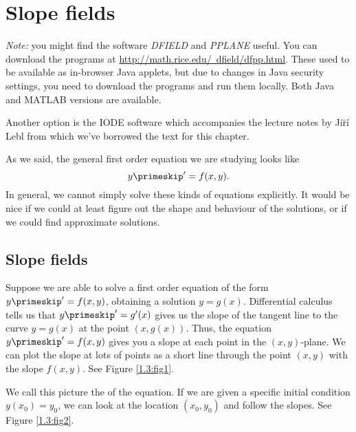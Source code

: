 \section{Slope fields}\label{sec:slopefields}

{\em Note:} you might find the software {\em DFIELD} and {\em PPLANE} useful. You can download the programs at \href{http://math.rice.edu/~dfield/dfpp.html}{http://math.rice.edu/\string~dfield/dfpp.html}. These used to be available as in-browser Java applets, but due to changes in Java security settings, you need to download the programs and run them locally. Both Java and MATLAB versions are available.

Another option is the IODE software which accompanies the lecture notes by Ji\u{r}\'{i} Lebl from which we've borrowed the text for this chapter.

\medskip

As we said, the general first order equation we are studying looks like
\begin{equation*}
y\primeskip ' = f(x,y).
\end{equation*}
In general, we cannot simply solve these kinds of equations explicitly.
It would be nice if we could at least figure out the shape and behaviour of
the solutions, or if we could find approximate solutions.

\subsection*{Slope fields}

Suppose we are able to solve a first order equation of the form $y\primeskip '=f(x,y)$, obtaining a solution $y=g(x)$. Differential calculus tells us that $y\primeskip '=g'(x)$ gives us the slope of the tangent line to the curve $y=g(x)$ at the point $(x,g(x))$.  Thus, the equation $y\primeskip ' = f(x,y)$
gives you a slope at each point 
in the
$(x,y)$-plane.  We can plot the slope at lots of points
as a short line through the point $(x,y)$ with the slope $f(x,y)$.
See Figure \ref{1.3:fig1}.



We call this picture the  of the equation.
If we are given a specific initial
condition $y(x_0) = y_0$, we can look at the
location $(x_0,y_0)$ and follow the slopes.  See Figure \ref{1.3:fig2}.

